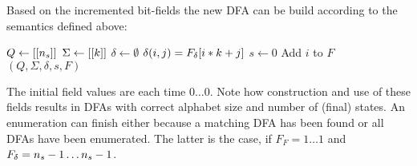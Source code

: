 \noindent Based on the incremented bit-fields the new DFA can be build according to the semantics defined above:
\vspace{0.2cm}
\begin{algorithmic}[1]
	\State $Q \gets [[{n_s}]]$
	\State $\Sigma \gets [[k]]$
	\State $\delta \gets \emptyset$
            \State $\delta(i, j) = F_\delta[i * k + j]$
		\EndFor
	\EndFor
	\State $s \gets 0$
			\State Add $i$ to $F$
		\EndIf
	\EndFor
	\State \Return $(Q, \Sigma, \delta, s, F)$
	\EndFunction
\end{algorithmic}
\vspace{0.2cm}
The initial field values are each time $0\ldots 0$. Note how construction and use of these fields results in DFAs with correct alphabet size and number of (final) states. An enumeration can finish either because a matching DFA has been found or all DFAs have been enumerated. The latter is the case, if $F_F = 1\ldots 1$ and $F_\delta = {n_s}-1 \ldots {n_s}-1$.


